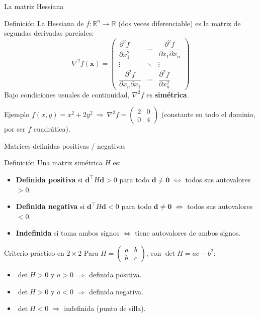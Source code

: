 \documentclass[aspectratio=169,10pt]{beamer}
\newcommand{\R}{\mathbb{R}}
\newcommand{\x}{\mathbf{x}}
\newcommand{\dd}{\mathbf{d}}
\newcommand{\Hess}{\nabla^2 f}
\begin{document}
\begin{frame}{La matriz Hessiana}
  \begin{block}{Definición}
    La Hessiana de $f:\R^n\to\R$ (dos veces diferenciable) es la matriz de
    segundas derivadas parciales:
    \[
      \Hess(\x) = \begin{pmatrix}
        \dfrac{\partial^2 f}{\partial x_1^2} & \cdots & \dfrac{\partial^2 f}{\partial x_1 \partial x_n} \\
        \vdots & \ddots & \vdots \\
        \dfrac{\partial^2 f}{\partial x_n \partial x_1} & \cdots & \dfrac{\partial^2 f}{\partial x_n^2}
      \end{pmatrix}
    \]
    Bajo condiciones usuales de continuidad, $\Hess$ es \textbf{simétrica}.
  \end{block}
  \begin{exampleblock}{Ejemplo}
    $f(x,y)=x^2+2y^2 \ \Rightarrow\ \Hess = \begin{pmatrix} 2 & 0 \\ 0 & 4 \end{pmatrix}$
    (constante en todo el dominio, por ser $f$ cuadrática).
  \end{exampleblock}
\end{frame}

\begin{frame}{Matrices definidas positivas / negativas}
  \begin{block}{Definición}
    Una matriz simétrica $H$ es:
    \begin{itemize}
      \item \textbf{Definida positiva} si $\dd^\top H \dd > 0$ para todo
        $\dd\neq\mathbf{0}$ $\Leftrightarrow$ todos sus autovalores $>0$.
      \item \textbf{Definida negativa} si $\dd^\top H \dd < 0$ para todo
        $\dd\neq\mathbf{0}$ $\Leftrightarrow$ todos sus autovalores $<0$.
      \item \textbf{Indefinida} si toma ambos signos $\Leftrightarrow$
        tiene autovalores de ambos signos.
    \end{itemize}
  \end{block}
  \begin{alertblock}{Criterio práctico en $2\times 2$}
    Para $H=\begin{pmatrix}a&b\\b&c\end{pmatrix}$, con
    $\det H = ac-b^2$:
    \begin{itemize}
      \item $\det H>0$ y $a>0$ $\Rightarrow$ definida positiva.
      \item $\det H>0$ y $a<0$ $\Rightarrow$ definida negativa.
      \item $\det H<0$ $\Rightarrow$ indefinida (punto de silla).
    \end{itemize}
  \end{alertblock}
\end{frame}
\end{document}
